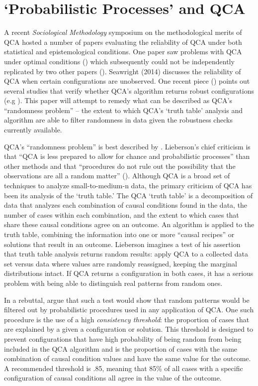\documentclass[]{article}
\begin{document}
{\section{`Probabilistic Processes' and QCA}


A recent {\it{Sociological Methodology}} symposium on the methodological merits of QCA hosted a number of papers evaluating the reliability of QCA under both statistical and epistemological conditions. One paper saw problems with QCA under optimal conditions (\citealt{lucas_and_szatrowski_2014}) which subsequently could not be independently replicated by two other papers (\citealt{ragin_2014,vaisey_2014}). Seawright (2014) discusses the reliability of QCA when certain configurations are unobserved. One recent piece (\citealt{collier_2014}) points out several studies that verify whether QCA's algorithm returns robust configurations (e.g \citealt{hug_2013,schneider_and_wagemann_2012,krogslund_et_al_2015}). This paper will attempt to remedy what can be described as QCA's ``randomness problem'' -- the extent to which QCA's `truth table' analysis and algorithm are able to filter randomness in data given the robustness checks currently available. 

QCA's ``randomness problem'' is best described by \citet{lieberson_2004}. Lieberson's chief criticism is that ``QCA is less prepared to allow for chance and probabilistic processes'' than other methods and that ``procedures do not rule out the possibility that the observations are all a random matter'' (\citealt[13]{lieberson_2004}). Although QCA is a broad set of techniques to analyze small-to-medium-n data, the primary criticism of QCA has been its analysis of the `truth table.' The QCA `truth table' is a decomposition of data that analyzes each combination of causal conditions found in the data, the number of cases within each combination, and the extent to which cases that share these causal conditions agree on an outcome. An algorithm is applied to the truth table, combining the information into one or more ``causal recipes'' or solutions that result in an outcome. Lieberson imagines a test of his assertion that truth table analysis returns random results: apply QCA to a collected data set versus data where values arre randomly reassigned, keeping the marginal distributions intact. If QCA returns a configuration in both cases, it has a serious problem with being able to distinguish real patterns from random ones.

In a rebuttal, \citet{rihoux_and_ragin_2009} argue that such a test would show that random patterns would be filtered out by probabilistic procedures used in any application of QCA. One such procedure is the use of a high {\it{consistency threshold}}: the proportion of cases that are explained by a given a configuration or solution. This threshold is designed to prevent configurations that have high probability of being random from being included in the QCA algorithm and is the proportion of cases with the same combination of causal condition values and have the same value for the outcome. A recommended threshold is .85, meaning that 85\% of all cases with a specific configuration of causal conditions all agree in the value of the outcome. 

}
\end{document}
